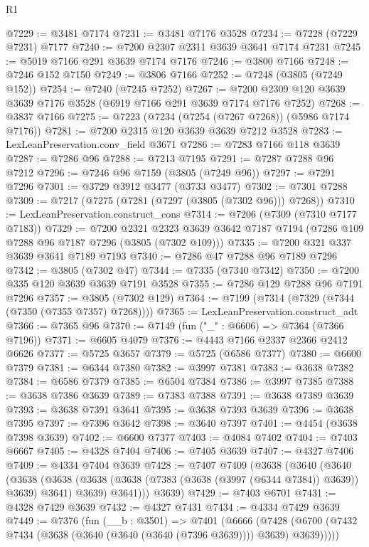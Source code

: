 \begin{lexlean}{R1}
\begin{coremodule}
@7229 := @3481 @7174
@7231 := @3481 @7176 @3528
@7234 := @7228 (@7229 @7231) @7177
@7240 := @7200 @2307 @2311 @3639 @3641 @7174 @7231
@7245 := @5019 @7166 @291 @3639 @7174 @7176
@7246 := @3800 @7166
@7248 := @7246 @152 @7150
@7249 := @3806 @7166
@7252 := @7248 (@3805 (@7249 @152))
@7254 := @7240 (@7245 @7252)
@7267 := @7200 @2309 @120 @3639 @3639 @7176 @3528 (@6919 @7166 @291 @3639 @7174 @7176 @7252)
@7268 := @3837 @7166
@7275 := @7223 (@7234 (@7254 (@7267 @7268)) (@5986 @7174 @7176))
@7281 := @7200 @2315 @120 @3639 @3639 @7212 @3528
@7283 := LexLeanPreservation.conv_field @3671
@7286 := @7283 @7166 @118 @3639
@7287 := @7286 @96
@7288 := @7213 @7195
@7291 := @7287 @7288 @96 @7212
@7296 := @7246 @96 @7159 (@3805 (@7249 @96))
@7297 := @7291 @7296
@7301 := @3729 @3912 @3477 (@3733 @3477)
@7302 := @7301 @7288
@7309 := @7217 (@7275 (@7281 (@7297 (@3805 (@7302 @96))) @7268))
@7310 := LexLeanPreservation.construct_cons
@7314 := @7206 (@7309 (@7310 @7177 @7183))
@7329 := @7200
    @2321
    @2323
    @3639
    @3642
    @7187
    @7194
    (@7286 @109 @7288 @96 @7187 @7296 (@3805 (@7302 @109)))
@7335 := @7200 @321 @337 @3639 @3641 @7189 @7193
@7340 := @7286 @47 @7288 @96 @7189 @7296
@7342 := @3805 (@7302 @47)
@7344 := @7335 (@7340 @7342)
@7350 := @7200 @335 @120 @3639 @3639 @7191 @3528
@7355 := @7286 @129 @7288 @96 @7191 @7296
@7357 := @3805 (@7302 @129)
@7364 := @7199 (@7314 (@7329 (@7344 (@7350 (@7355 @7357) @7268))))
@7365 := LexLeanPreservation.construct_adt
@7366 := @7365 @96
@7370 := @7149 (fun ("_" : @6606) => @7364 (@7366 @7196))
@7371 := @6605 @4079
@7376 := @4443 @7166 @2337 @2366 @2412 @6626
@7377 := @5725 @3657
@7379 := @5725 (@6586 @7377)
@7380 := @6600 @7379
@7381 := @6344 @7380
@7382 := @3997 @7381
@7383 := @3638 @7382
@7384 := @6586 @7379
@7385 := @6504 @7384
@7386 := @3997 @7385
@7388 := @3638 @7386 @3639
@7389 := @7383 @7388
@7391 := @3638 @7389 @3639
@7393 := @3638 @7391 @3641
@7395 := @3638 @7393 @3639
@7396 := @3638 @7395
@7397 := @7396 @3642
@7398 := @3640 @7397
@7401 := @4454 (@3638 @7398 @3639)
@7402 := @6600 @7377
@7403 := @4084 @7402
@7404 := @7403 @6667
@7405 := @4328 @7404
@7406 := @7405 @3639
@7407 := @4327 @7406
@7409 := @4334 @7404 @3639
@7428 := @7407
    @7409
    (@3638
      (@3640
        (@3640
          (@3638
            (@3638 (@3638 (@3638 (@7383 (@3638 (@3997 (@6344 @7384)) @3639)) @3639) @3641) @3639)
            @3641)))
      @3639)
@7429 := @7403 @6701
@7431 := @4328 @7429 @3639
@7432 := @4327 @7431
@7434 := @4334 @7429 @3639
@7449 := @7376
    (fun (__b : @3501) =>
    @7401
      (@6666
        (@7428 (@6700 (@7432 @7434 (@3638 (@3640 (@3640 (@3640 (@7396 @3639)))) @3639) @3639)))))

\end{coremodule}
\end{lexlean}
